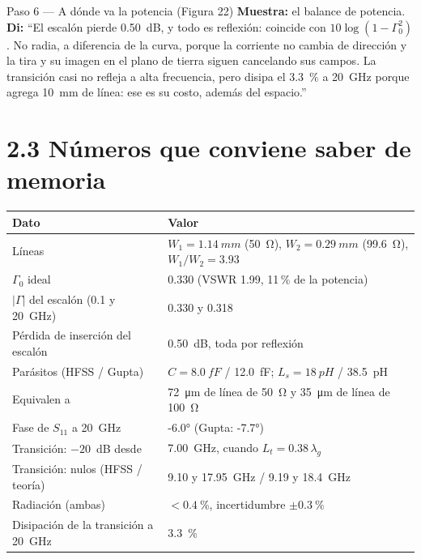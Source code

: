 \documentclass[11pt,letterpaper]{article}
\begin{document}
\begin{paso}{Paso 6 --- A dónde va la potencia (Figura 22)}
\textbf{Muestra:} el balance de potencia.\\
\textbf{Di:} ``El escalón pierde \SI{0.50}{dB}, y todo es reflexión: coincide con $10\log(1-\Gamma_0^2)$. No radia, a diferencia de la curva, porque la corriente no cambia de dirección y la tira y su imagen en el plano de tierra siguen cancelando sus campos. La transición casi no refleja a alta frecuencia, pero disipa el \SI{3.3}{\percent} a \SI{20}{GHz} porque agrega \SI{10}{mm} de línea: ese es su costo, además del espacio.''
\end{paso}

\section*{2.3 Números que conviene saber de memoria}
\begin{center}
\small
\begin{tabular}{ll}
\toprule
Dato & Valor \\
\midrule
Líneas & $W_1=\SI{1.14}{mm}$ (\SI{50}{\ohm}), $W_2=\SI{0.29}{mm}$ (\SI{99.6}{\ohm}), $W_1/W_2=3.93$ \\
$\Gamma_0$ ideal & 0.330 (VSWR 1.99, 11\,\% de la potencia) \\
$|\Gamma|$ del escalón (0.1 y \SI{20}{GHz}) & 0.330 y 0.318 \\
Pérdida de inserción del escalón & \SI{0.50}{dB}, toda por reflexión \\
Parásitos (HFSS / Gupta) & $C=\SI{8.0}{fF}$ / \SI{12.0}{fF}; $L_s=\SI{18}{pH}$ / \SI{38.5}{pH} \\
Equivalen a & \SI{72}{\micro\metre} de línea de \SI{50}{\ohm} y \SI{35}{\micro\metre} de línea de \SI{100}{\ohm} \\
Fase de $S_{11}$ a \SI{20}{GHz} & \ang{-6.0} (Gupta: \ang{-7.7}) \\
Transición: $-20$~dB desde & \SI{7.00}{GHz}, cuando $L_t=0.38\,\lambda_g$ \\
Transición: nulos (HFSS / teoría) & \SI{9.10}{} y \SI{17.95}{GHz} / \SI{9.19}{} y \SI{18.4}{GHz} \\
Radiación (ambas) & $<\SI{0.4}{\percent}$, incertidumbre $\pm\SI{0.3}{\percent}$ \\
Disipación de la transición a \SI{20}{GHz} & \SI{3.3}{\percent} \\
\bottomrule
\end{tabular}
\end{center}
\end{document}
